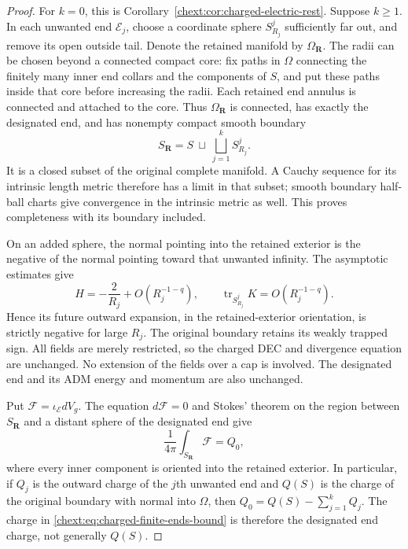 \begin{proof}
For $k=0$, this is Corollary~\ref{chext:cor:charged-electric-rest}.  Suppose
$k\ge1$.  In each unwanted end $\mathscr E_j$, choose a coordinate
sphere $S_{R_j}^j$ sufficiently far out, and remove its open outside
tail.  Denote the retained manifold by $\Omega_{\mathbf R}$.
The radii can be chosen beyond a connected compact core: fix paths
in $\Omega$ connecting the finitely many inner end collars and the
components of $S$, and put these paths inside that core before
increasing the radii.  Each retained end annulus is connected and
attached to the core.  Thus $\Omega_{\mathbf R}$ is connected, has
exactly the designated end, and has nonempty compact smooth boundary
\[
 S_{\mathbf R}=S\ \sqcup\ \bigsqcup_{j=1}^kS_{R_j}^j.
\]
It is a closed subset of the original complete manifold.  A Cauchy
sequence for its intrinsic length metric therefore has a limit in
that subset; smooth boundary half-ball charts give convergence in
the intrinsic metric as well.  This proves completeness with its
boundary included.

On an added sphere, the normal pointing into the retained exterior
is the negative of the normal pointing toward that unwanted infinity.
The asymptotic estimates give
\[
 H=-\frac2{R_j}+O(R_j^{-1-q}),\qquad
 \operatorname{tr}_{S_{R_j}^j}K=O(R_j^{-1-q}).
\]
Hence its future outward expansion, in the retained-exterior
orientation, is strictly negative for large $R_j$.  The original
boundary retains its weakly trapped sign.  All fields are merely
restricted, so the charged DEC and divergence equation are unchanged.
No extension of the fields over a cap is involved.  The designated
end and its ADM energy and momentum are also unchanged.

Put $\mathcal F=\iota_{\mathcal E}dV_g$.  The equation
$d\mathcal F=0$ and Stokes' theorem on the region between
$S_{\mathbf R}$ and a distant sphere of the designated end give
\begin{equation}\label{chext:eq:charged-tail-flux}
 \frac1{4\pi}\int_{S_{\mathbf R}}\mathcal F=Q_0,
\end{equation}
where every inner component is oriented into the retained exterior.
In particular, if $Q_j$ is the outward charge of the $j$th unwanted
end and $Q(S)$ is the charge of the original boundary with normal
into $\Omega$, then $Q_0=Q(S)-\sum_{j=1}^kQ_j$.
The charge in \eqref{chext:eq:charged-finite-ends-bound} is therefore the
designated end charge, not generally $Q(S)$.


\end{proof}
